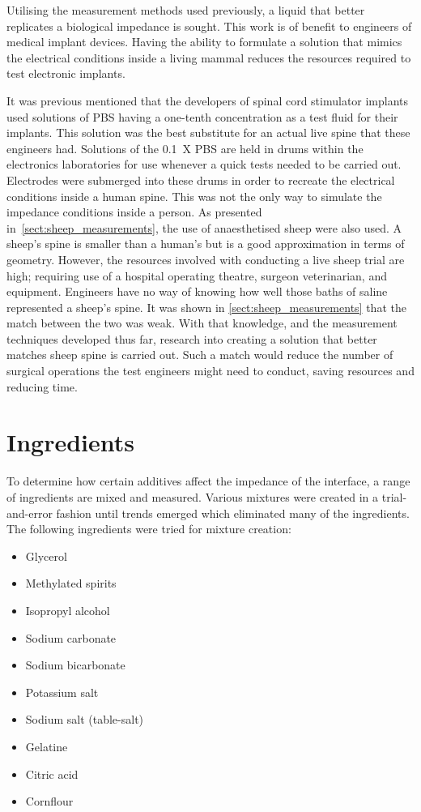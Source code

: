 
Utilising the measurement methods used previously, a liquid that better replicates a biological impedance is sought.
This work is of benefit to engineers of medical implant devices.
Having the ability to formulate a solution that mimics the electrical conditions inside a living mammal reduces the resources required to test electronic implants.

It was previous mentioned that the developers of spinal cord stimulator implants used solutions of PBS having a one-tenth concentration as a test fluid for their implants.
This solution was the best substitute for an actual live spine that these engineers had.
Solutions of the \SI{0.1}{X} PBS are held in drums within the electronics laboratories for use whenever a quick tests needed to be carried out.
Electrodes were submerged into these drums in order to recreate the electrical conditions inside a human spine.
This was not the only way to simulate the impedance conditions inside a person.
As presented in~\cref{sect:sheep_measurements}, the use of anaesthetised sheep were also used.
A sheep's spine is smaller than a human's but is a good approximation in terms of geometry.
However, the resources involved with conducting a live sheep trial are high; requiring use of a hospital operating theatre, surgeon veterinarian, and equipment.
Engineers have no way of knowing how well those baths of saline represented a sheep's spine.
It was shown in \cref{sect:sheep_measurements} that the match between the two was weak.
With that knowledge, and the measurement techniques developed thus far, research into creating a solution that better matches sheep spine is carried out.
Such a match would reduce the number of surgical operations the test engineers might need to conduct, saving resources and reducing time.

\section{Ingredients}

  To determine how certain additives affect the impedance of the interface, a range of ingredients are mixed and measured.
  Various mixtures were created in a trial-and-error fashion until trends emerged which eliminated many of the ingredients.
  The following ingredients were tried for mixture creation:
  \begin{itemize}
      \item Glycerol
      \item Methylated spirits
      \item Isopropyl alcohol
      \item Sodium carbonate
      \item Sodium bicarbonate
      \item Potassium salt
      \item Sodium salt (table-salt)
      \item Gelatine
      \item Citric acid
      \item Cornflour
  \end{itemize}

